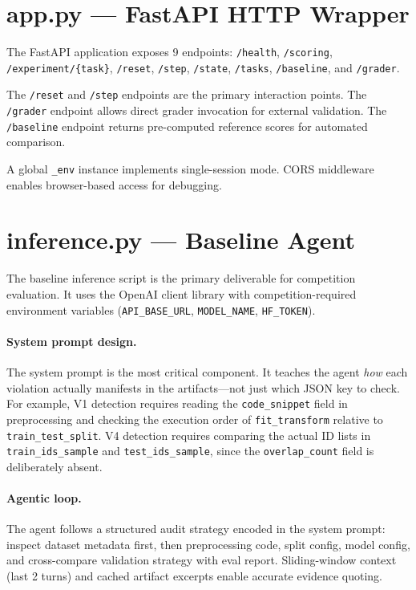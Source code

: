 \documentclass{article}
\begin{document}
\section{app.py --- FastAPI HTTP Wrapper}

The FastAPI application exposes 9 endpoints:
\texttt{/health}, \texttt{/scoring}, \texttt{/experiment/\{task\}},
\texttt{/reset}, \texttt{/step}, \texttt{/state}, \texttt{/tasks},
\texttt{/baseline}, and \texttt{/grader}.

The \texttt{/reset} and \texttt{/step} endpoints are the primary
interaction points.  The \texttt{/grader} endpoint allows direct grader
invocation for external validation.  The \texttt{/baseline} endpoint
returns pre-computed reference scores for automated comparison.

A global \texttt{\_env} instance implements single-session mode.
CORS middleware enables browser-based access for debugging.

\section{inference.py --- Baseline Agent}

The baseline inference script is the primary deliverable for competition
evaluation.  It uses the OpenAI client library with competition-required
environment variables (\texttt{API\_BASE\_URL}, \texttt{MODEL\_NAME},
\texttt{HF\_TOKEN}).

\paragraph{System prompt design.}
The system prompt is the most critical component.  It teaches the agent
\emph{how} each violation actually manifests in the artifacts---not just
which JSON key to check.  For example, V1 detection requires reading
the \texttt{code\_snippet} field in preprocessing and checking the
execution order of \texttt{fit\_transform} relative to
\texttt{train\_test\_split}.  V4 detection requires comparing the actual
ID lists in \texttt{train\_ids\_sample} and \texttt{test\_ids\_sample},
since the \texttt{overlap\_count} field is deliberately absent.

\paragraph{Agentic loop.}
The agent follows a structured audit strategy encoded in the system prompt:
inspect dataset metadata first, then preprocessing code, split config,
model config, and cross-compare validation strategy with eval report.
Sliding-window context (last 2 turns) and cached artifact excerpts enable
accurate evidence quoting.
\end{document}
